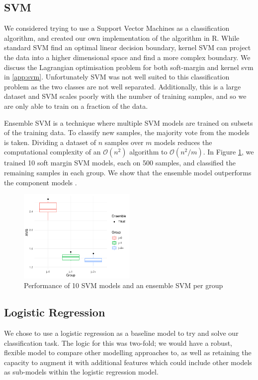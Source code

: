 \subsection{SVM}
We considered trying to use a Support Vector Machines as a classification algorithm, and created our own implementation of the algorithm in R. While standard SVM find an optimal linear decision boundary, kernel SVM can project the data into a higher dimensional space and find a more complex boundary. We discuss the Lagrangian optimisation problem for both soft-margin and kernel svm in \ref{app:svm}. Unfortunately SVM was not well suited to this classification problem as the two classes are not well separated. Additionally, this is a large dataset and SVM scales poorly with the number of training samples, and so we are only able to train on a fraction of the data.

Ensemble SVM is a technique where multiple SVM models are trained on subsets of the training data. To classify new samples, the majority vote from the models is taken. Dividing a dataset of $n$ samples over $m$ models reduces the computational complexity of an $\mathcal{O}(n^2)$ algorithm to $\mathcal{O}(n^2/m)$. In Figure \ref{fig:svm}, we trained 10 soft margin SVM models, each on 500 samples, and classified the remaining samples in each group. We show that the ensemble model outperforms the component models . 

\begin{figure}[h]
    \centering
	\includegraphics[width=0.5\textwidth]{Ensemble_SVM.pdf}
    \caption{Performance of 10 SVM models and an ensemble SVM per group}
    \label{fig:svm}
\end{figure}

\subsection{Logistic Regression}
We chose to use a logistic regression as a baseline model to try and solve our classification task. The logic for this was two-fold; we would have a robust, flexible model to compare other modelling approaches to, as well as retaining the capacity to augment it with additional features which could include other models as sub-models within the logistic regression model. 

